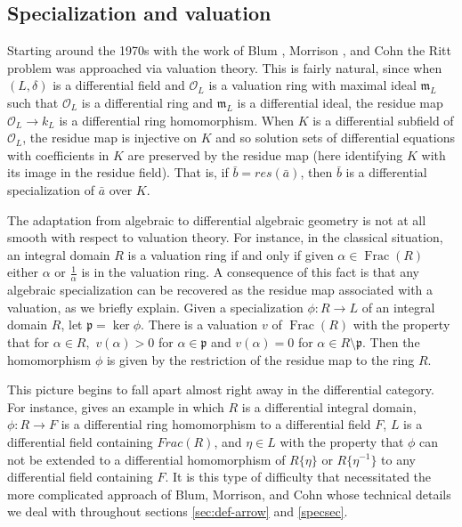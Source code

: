 \documentclass[12pt]{amsart}
\theoremstyle{definition}
\numberwithin{subcase}{cases}
\theoremstyle{remark}
\newcommand{\mc}[1]{\mathcal{#1}}
\DeclareMathOperator{\Frac}{Frac}
\begin{document}
\subsection{Specialization and valuation} 
Starting around the 1970s with the work of Blum \cite{Blum1969, Blum1970}, Morrison \cite{Morrison78, Morrison79}, and Cohn \cite{Cohn77, Cohn1979, Cohn1986SecondOrder, Cohn1986Valuations} the Ritt problem was approached via valuation theory. This is fairly natural, since when $(L, \delta)$ is a differential field and $\mc O_L$ is a valuation ring with maximal ideal $\mathfrak m_L$ such that $\mc O_L$ is a differential ring and $\mathfrak m_L$ is a differential ideal, the residue map $\mc O_L \rightarrow k_L$ is a differential ring homomorphism. When $K$ is a differential subfield of $\mc O_L$, the residue map is injective on $K$ and so solution sets of differential equations with coefficients in $K$ are preserved by the residue map (here identifying $K$ with its image in the residue field). That is, if $\bar b = res (\bar a)$, then $\bar b$ is a differential specialization of $\bar a$ over $K.$ 

The adaptation from algebraic to differential algebraic geometry is not at all smooth with respect to valuation theory. For instance, in the classical situation, an integral domain $R$ is a valuation ring if and only if given $\alpha \in \Frac(R)$ either $\alpha$ or $\frac{1}{\alpha}$ is in the valuation ring. A consequence of this fact is that any algebraic specialization can be recovered as the residue map associated with a valuation, as we briefly explain. Given a specialization $\phi:R\to L$ of an integral domain $R$, let $\mathfrak p=\ker\phi$. There is a valuation $v$ of $\Frac(R)$ with the property that for $\alpha \in R,$ $v(\alpha) >0 $ for $\alpha \in \mathfrak p$ and $v(\alpha ) = 0 $ for $\alpha \in R \setminus \mathfrak p$. Then the homomorphism $\phi $ is given by the restriction of the residue map to the ring $R$. 

This picture begins to fall apart almost right away in the differential category. For instance, \cite[page 159]{Kolchin73} gives an example in which $R$ is a differential integral domain, $\phi: R \rightarrow F$ is a differential ring homomorphism to a differential field $F$, $L$ is a differential field containing $Frac(R)$, and $\eta \in L$ with the property that $\phi$ can not be extended to a differential homomorphism of $R\{\eta \} $ or $R\{ \eta^{-1} \}$ to any differential field containing $F$. It is this type of difficulty that necessitated the more complicated approach of Blum, Morrison, and Cohn whose technical details we deal with throughout sections \ref{sec:def-arrow} and \ref{specsec}.
\end{document}
